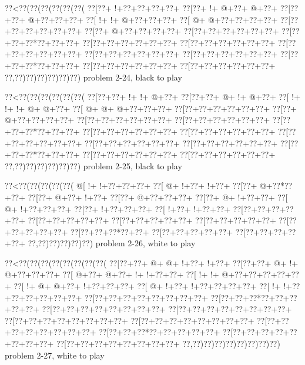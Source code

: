 \vbox{\vbox{\goo
\0??<\0??(\0??(\0??(\0??(\0??(\0??(
\0??[\0??+\- !+\0??+\0??+\0??+\0??+
\0??[\0??+\- !+\- @+\0??+\- @+\0??+
\0??[\0??+\0??+\- @+\0??+\0??+\0??+
\0??[\- !+\- !+\- @+\0??+\0??+\0??+
\0??[\- @+\- @+\0??+\0??+\0??+\0??+
\0??[\0??+\0??+\0??+\0??+\0??+\0??+
\0??[\0??+\- @+\0??+\0??+\0??+\0??+
\0??[\0??+\0??+\0??+\0??+\0??+\0??+
\0??[\0??+\0??+\0??*\0??+\0??+\0??+
\0??[\0??+\0??+\0??+\0??+\0??+\0??+
\0??[\0??+\0??+\0??+\0??+\0??+\0??+
\0??[\0??+\0??+\0??+\0??+\0??+\0??+
\0??[\0??+\0??+\0??+\0??+\0??+\0??+
\0??[\0??+\0??+\0??+\0??+\0??+\0??+
\0??[\0??+\0??+\0??*\0??+\0??+\0??+
\0??[\0??+\0??+\0??+\0??+\0??+\0??+
\0??[\0??+\0??+\0??+\0??+\0??+\0??+
\0??,\0??)\0??)\0??)\0??)\0??)\0??)
}
\hfil problem 2-24, black to play\hfil\break
}

\vbox{\vbox{\goo
\0??<\0??(\0??(\0??(\0??(\0??(\0??(
\0??[\0??+\0??+\- !+\- !+\- @+\0??+
\0??[\0??+\0??+\- @+\- !+\- @+\0??+
\0??[\- !+\- !+\- !+\- @+\- @+\0??+
\0??[\- @+\- @+\- @+\0??+\0??+\0??+
\0??[\0??+\0??+\0??+\0??+\0??+\0??+
\0??[\0??+\- @+\0??+\0??+\0??+\0??+
\0??[\0??+\0??+\0??+\0??+\0??+\0??+
\0??[\0??+\0??+\0??+\0??+\0??+\0??+
\0??[\0??+\0??+\0??*\0??+\0??+\0??+
\0??[\0??+\0??+\0??+\0??+\0??+\0??+
\0??[\0??+\0??+\0??+\0??+\0??+\0??+
\0??[\0??+\0??+\0??+\0??+\0??+\0??+
\0??[\0??+\0??+\0??+\0??+\0??+\0??+
\0??[\0??+\0??+\0??+\0??+\0??+\0??+
\0??[\0??+\0??+\0??*\0??+\0??+\0??+
\0??[\0??+\0??+\0??+\0??+\0??+\0??+
\0??[\0??+\0??+\0??+\0??+\0??+\0??+
\0??,\0??)\0??)\0??)\0??)\0??)\0??)
}
\hfil problem 2-25, black to play\hfil\break
}

\vbox{\vbox{\goo
\0??<\0??(\0??(\0??(\0??(\0??(
\- @[\- !+\- !+\0??+\0??+\0??+
\0??[\- @+\- !+\0??+\- !+\0??+
\0??[\0??+\- @+\0??*\0??+\0??+
\0??[\0??+\- @+\0??+\- !+\0??+
\0??[\0??+\- @+\0??+\0??+\0??+
\0??[\0??+\- @+\- !+\0??+\0??+
\0??[\- @+\- !+\0??+\0??+\0??+
\0??[\0??+\- !+\0??+\0??+\0??+
\0??[\- !+\0??+\- !+\0??+\0??+
\0??[\0??+\0??+\0??+\0??+\0??+
\0??[\0??+\0??+\0??+\0??+\0??+
\0??[\0??+\0??+\0??+\0??+\0??+
\0??[\0??+\0??+\0??+\0??+\0??+
\0??[\0??+\0??+\0??+\0??+\0??+
\0??[\0??+\0??+\0??*\0??+\0??+
\0??[\0??+\0??+\0??+\0??+\0??+
\0??[\0??+\0??+\0??+\0??+\0??+
\0??,\0??)\0??)\0??)\0??)\0??)
}
\hfil problem 2-26, white to play\hfil\break
}

\vbox{\vbox{\goo
\0??<\0??(\0??(\0??(\0??(\0??(\0??(\0??(\0??(
\0??[\0??+\0??+\- @+\- @+\- !+\0??+\- !+\0??+
\0??[\0??+\0??+\- @+\- !+\- @+\0??+\0??+\0??+
\0??[\- @+\0??+\- @+\0??+\- !+\- !+\0??+\0??+
\0??[\- !+\- !+\- @+\0??+\0??+\0??+\0??+\0??+
\0??[\- !+\- @+\- @+\0??+\- !+\0??+\0??+\0??+
\0??[\- @+\- !+\0??+\- !+\0??+\0??+\0??+\0??+
\0??[\- !+\- !+\0??+\0??+\0??+\0??+\0??+\0??+
\0??[\0??+\0??+\0??+\0??+\0??+\0??+\0??+\0??+
\0??[\0??+\0??+\0??*\0??+\0??+\0??+\0??+\0??+
\0??[\0??+\0??+\0??+\0??+\0??+\0??+\0??+\0??+
\0??[\0??+\0??+\0??+\0??+\0??+\0??+\0??+\0??+
\0??[\0??+\0??+\0??+\0??+\0??+\0??+\0??+\0??+
\0??[\0??+\0??+\0??+\0??+\0??+\0??+\0??+\0??+
\0??[\0??+\0??+\0??+\0??+\0??+\0??+\0??+\0??+
\0??[\0??+\0??+\0??*\0??+\0??+\0??+\0??+\0??+
\0??[\0??+\0??+\0??+\0??+\0??+\0??+\0??+\0??+
\0??[\0??+\0??+\0??+\0??+\0??+\0??+\0??+\0??+
\0??,\0??)\0??)\0??)\0??)\0??)\0??)\0??)\0??)
}
\hfil problem 2-27, white to play\hfil\break
}

